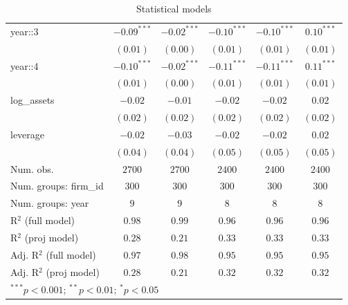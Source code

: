 \begin{table}
\begin{center}
\begin{tabular}{l c c c c c}
year::3                 & $-0.09^{***}$ & $-0.02^{***}$ & $-0.10^{***}$ & $-0.10^{***}$ & $0.10^{***}$ \\
                        & $(0.01)$      & $(0.00)$      & $(0.01)$      & $(0.01)$      & $(0.01)$     \\
year::4                 & $-0.10^{***}$ & $-0.02^{***}$ & $-0.11^{***}$ & $-0.11^{***}$ & $0.11^{***}$ \\
                        & $(0.01)$      & $(0.00)$      & $(0.01)$      & $(0.01)$      & $(0.01)$     \\
log\_assets             & $-0.02$       & $-0.01$       & $-0.02$       & $-0.02$       & $0.02$       \\
                        & $(0.02)$      & $(0.02)$      & $(0.02)$      & $(0.02)$      & $(0.02)$     \\
leverage                & $-0.02$       & $-0.03$       & $-0.02$       & $-0.02$       & $0.02$       \\
                        & $(0.04)$      & $(0.04)$      & $(0.05)$      & $(0.05)$      & $(0.05)$     \\
\hline
Num. obs.               & $2700$        & $2700$        & $2400$        & $2400$        & $2400$       \\
Num. groups: firm\_id   & $300$         & $300$         & $300$         & $300$         & $300$        \\
Num. groups: year       & $9$           & $9$           & $8$           & $8$           & $8$          \\
R$^2$ (full model)      & $0.98$        & $0.99$        & $0.96$        & $0.96$        & $0.96$       \\
R$^2$ (proj model)      & $0.28$        & $0.21$        & $0.33$        & $0.33$        & $0.33$       \\
Adj. R$^2$ (full model) & $0.97$        & $0.98$        & $0.95$        & $0.95$        & $0.95$       \\
Adj. R$^2$ (proj model) & $0.28$        & $0.21$        & $0.32$        & $0.32$        & $0.32$       \\
\hline
\multicolumn{6}{l}{\scriptsize{$^{***}p<0.001$; $^{**}p<0.01$; $^{*}p<0.05$}}
\end{tabular}
\caption{Statistical models}
\label{table:coefficients}
\end{center}
\end{table}
